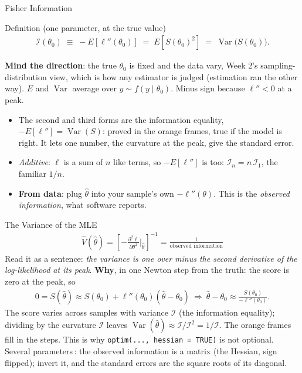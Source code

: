\documentclass[aspectratio=169,11pt,xcolor=dvipsnames]{beamer}
\DeclareMathOperator{\Var}{Var}
\newcommand{\E}{E}
\newcommand{\loglik}{\ell}
\newcommand{\Info}{\mathcal{I}}
\newcommand{\adv}{\,\raisebox{0.6pt}{\textcolor{accent}{$\bigstar$}}}
\newcommand{\core}{\,\raisebox{0.6pt}{\textcolor{corestar}{$\bigstar$}}}
\begin{document}
\begin{frame}{Fisher Information\core}
\begin{block}{Definition (one parameter, at the true value)}
\begin{align*}
  \Info(\theta_0) \;\equiv\; -\E\!\left[\loglik''(\theta_0)\right]
  \;=\; \E\!\left[S(\theta_0)^{2}\right]
  \;=\; \Var\big(S(\theta_0)\big) .
\end{align*}
\end{block}
\vskip2pt
\textbf{Mind the direction}: the true $\theta_0$ is fixed and the data
vary, Week 2's sampling-distribution view, which is how any estimator is
judged (estimation ran the other way). $\E$ and $\Var$ average over
$y \sim f(y\mid\theta_0)$. Minus sign because $\loglik''<0$ at a peak.
\vskip1pt
\begin{itemize}\itemsep2pt
  \item The second and third forms are the \alert{information equality},
        $-\E[\loglik''] = \Var(S)$: proved in the orange frames, true if the
        model is right. It lets one number, the curvature at the peak, give
        the standard error.
  \item \emph{Additive}: $\loglik$ is a sum of $n$ like terms, so
        $-\E[\loglik'']$ is too: $\Info_n = n\,\Info_1$, the familiar $1/n$.
  \item \textbf{From data}: plug $\hat\theta$ into your sample's own
        $-\loglik''(\theta)$. This is the \emph{observed information},
        what software reports.
\end{itemize}
\end{frame}

\begin{frame}{The Variance of the MLE\core}
\begin{align*}
  \boxed{\;\hat{V}(\hat\theta)
  = \left[-\frac{\partial^2\loglik}{\partial\theta^2}\bigg|_{\hat\theta}\right]^{-1}
  = \frac{1}{\text{observed information}}\;}
\end{align*}
Read it as a sentence: \emph{the variance is one over minus the second
derivative of the log-likelihood at its peak}. \textbf{Why}, in one Newton
step from the truth: the score is zero at the peak, so
\begingroup\setlength{\abovedisplayskip}{2pt}\setlength{\belowdisplayskip}{2pt}
\begin{align*}
  0 = S(\hat\theta) \approx S(\theta_0) + \loglik''(\theta_0)(\hat\theta-\theta_0)
  \ \Longrightarrow\
  \hat\theta - \theta_0 \approx \frac{S(\theta_0)}{-\loglik''(\theta_0)} .
\end{align*}
\endgroup
The score varies across samples with variance $\Info$ (the information
equality); dividing by the curvature $\Info$ leaves
$\Var(\hat\theta) \approx \Info/\Info^2 = 1/\Info$. The orange frames fill
in the steps. This is why \texttt{optim(..., hessian = TRUE)} is not
optional.
\vskip1pt
{\footnotesize Several parameters\adv: the observed information is a matrix
(the Hessian, sign flipped); invert it, and the standard errors are the
square roots of its diagonal.}
\end{frame}
\end{document}
